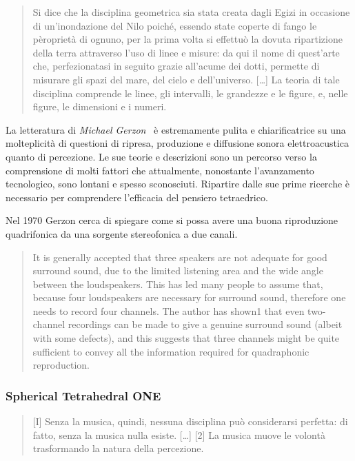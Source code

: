 \documentclass[a4paper,11pt]{article}
\begin{document}
\begin{quote}
Si dice che la disciplina geometrica sia stata creata dagli Egizi in
occasione di un'inondazione del Nilo poiché, essendo state coperte di
fango le pèroprietà di ognuno, per la prima volta si effettuò la
dovuta ripartizione della terra attraverso l'uso di linee e misure: da
qui il nome di quest'arte che, perfezionatasi in seguito grazie
all'acume dei dotti, permette di misurare gli spazi del mare, del
cielo e dell'universo. {[}\ldots{}{]} La teoria di tale disciplina comprende
le linee, gli intervalli, le grandezze e le figure, e, nelle figure,
le dimensioni e i numeri.
\end{quote}

La letteratura di \emph{Michael Gerzon}  è estremamente pulita e
chiarificatrice su una molteplicità di questioni di ripresa, produzione
e diffusione sonora elettroacustica quanto di percezione. Le sue teorie
e descrizioni sono un percorso verso la comprensione di molti fattori
che attualmente, nonostante l'avanzamento tecnologico, sono lontani e
spesso sconosciuti. Ripartire dalle sue prime ricerche è necessario per
comprendere l'efficacia del pensiero tetraedrico.

Nel 1970 Gerzon cerca di spiegare come si possa avere una buona
riproduzione quadrifonica da una sorgente stereofonica a due canali.

\begin{quote}
It is generally accepted that three speakers are not adequate for good
surround sound, due to the limited listening area and the wide angle
between the loudspeakers. This has led many people to assume that,
because four loudspeakers are necessary for surround sound, therefore
one needs to record four channels. The author has shown1 that even
two-channel recordings can be made to give a genuine surround sound
(albeit with some defects), and this suggests that three channels
might be quite sufficient to convey all the information required for
quadraphonic reproduction.
\end{quote}

\subsubsection{Spherical Tetrahedral ONE}\hypertarget{spherical-tetrahedral-one}{}\label{spherical-tetrahedral-one}

\begin{quote}
{[}I{]} Senza la musica, quindi, nessuna disciplina può considerarsi
perfetta: di fatto, senza la musica nulla esiste. {[}\ldots{}{]} {[}2{]} La
musica muove le volontà trasformando la natura della percezione.
\end{quote}
\end{document}
